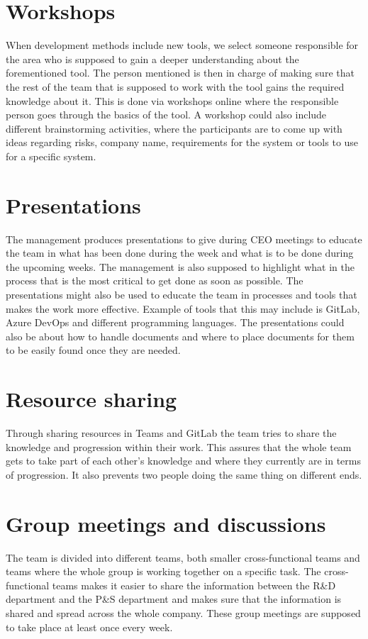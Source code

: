 \documentclass[12pt]{article}
\begin{document}
    
    
\clearpage

    \section{Workshops}
  When development methods include new tools, we select someone responsible for the area who is supposed to gain a deeper understanding about the forementioned tool. The person mentioned is then in charge of making sure that the rest of the team that is supposed to work with the tool gains the required knowledge about it. This is done via workshops online where the responsible person goes through the basics of the tool.  A workshop could also include different brainstorming activities, where the participants are to come up with ideas regarding risks, company name, requirements for the system or tools to use for a specific system.
  
    \section{Presentations}
The management produces presentations to give during CEO meetings to educate the team in what has been done during the week and what is to be done during the upcoming weeks. The management is also supposed to highlight what in the process that is the most critical to get done as soon as possible. The presentations might also be used to educate the team in processes and tools that makes the work more effective. Example of tools that this may include is GitLab, Azure DevOps and different programming languages. The presentations could also be about how to handle documents and where to place documents for them to be easily found once they are needed. 

    \section{Resource sharing}
 Through sharing resources in Teams and GitLab the team tries to share the knowledge and progression within their work. This assures that the whole team gets to take part of each other’s knowledge and where they currently are in terms of progression. It also prevents two people doing the same thing on different ends. 
 
    \section{Group meetings and discussions}
The team is divided into different teams, both smaller cross-functional teams and teams where the whole group is working together on a specific task. The cross-functional teams makes it easier to share the information between the R&D department and the P&S department and makes sure that the information is shared and spread across the whole company. These group meetings are supposed to take place at least once every week.
\end{document}
